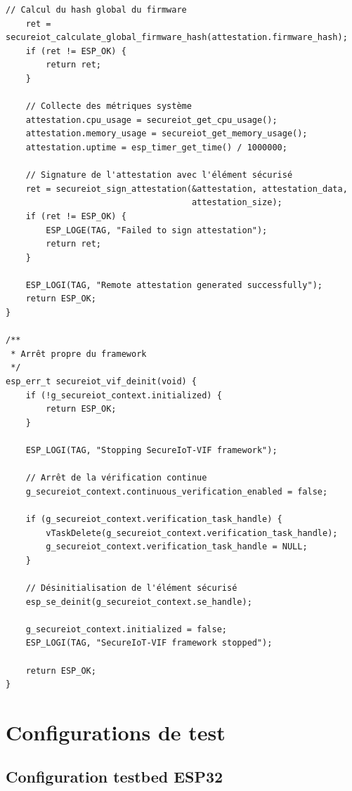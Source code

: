 \begin{lstlisting}[caption={Implémentation complète du module de vérification d'intégrité pour ESP32}]
    // Calcul du hash global du firmware
    ret = secureiot_calculate_global_firmware_hash(attestation.firmware_hash);
    if (ret != ESP_OK) {
        return ret;
    }
    
    // Collecte des métriques système
    attestation.cpu_usage = secureiot_get_cpu_usage();
    attestation.memory_usage = secureiot_get_memory_usage();
    attestation.uptime = esp_timer_get_time() / 1000000;
    
    // Signature de l'attestation avec l'élément sécurisé
    ret = secureiot_sign_attestation(&attestation, attestation_data, 
                                     attestation_size);
    if (ret != ESP_OK) {
        ESP_LOGE(TAG, "Failed to sign attestation");
        return ret;
    }
    
    ESP_LOGI(TAG, "Remote attestation generated successfully");
    return ESP_OK;
}

/**
 * Arrêt propre du framework
 */
esp_err_t secureiot_vif_deinit(void) {
    if (!g_secureiot_context.initialized) {
        return ESP_OK;
    }
    
    ESP_LOGI(TAG, "Stopping SecureIoT-VIF framework");
    
    // Arrêt de la vérification continue
    g_secureiot_context.continuous_verification_enabled = false;
    
    if (g_secureiot_context.verification_task_handle) {
        vTaskDelete(g_secureiot_context.verification_task_handle);
        g_secureiot_context.verification_task_handle = NULL;
    }
    
    // Désinitialisation de l'élément sécurisé
    esp_se_deinit(g_secureiot_context.se_handle);
    
    g_secureiot_context.initialized = false;
    ESP_LOGI(TAG, "SecureIoT-VIF framework stopped");
    
    return ESP_OK;
}
\end{lstlisting}

\section{Configurations de test}

\subsection{Configuration testbed ESP32}

